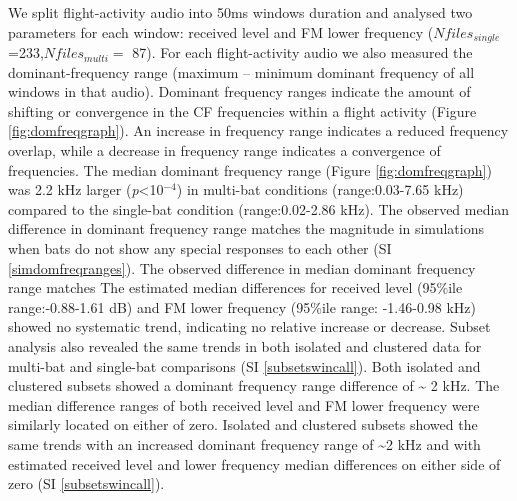 \documentclass[
]{book}
\begin{document}
We split flight-activity audio into 50ms windows duration and analysed two parameters for each window: received level and FM lower frequency (\(Nfiles_{single}\)=233,\(Nfiles_{multi}=\) 87). For each flight-activity audio we also measured the dominant-frequency range (maximum -- minimum dominant frequency of all windows in that audio). Dominant frequency ranges indicate the amount of shifting or convergence in the CF frequencies within a flight activity (Figure \ref{fig:domfreqgraph}). An increase in frequency range indicates a reduced frequency overlap, while a decrease in frequency range indicates a convergence of frequencies. The median dominant frequency range (Figure \ref{fig:domfreqgraph}) was 2.2 kHz larger (\emph{p}\textless10\(^{-4}\)) in multi-bat conditions (range:0.03-7.65 kHz) compared to the single-bat condition (range:0.02-2.86 kHz). The observed median difference in dominant frequency range matches the magnitude in simulations when bats do not show any special responses to each other (SI \ref{simdomfreqranges}). The observed difference in median dominant frequency range matches The estimated median differences for received level (95\(\%\)ile range:-0.88-1.61 dB) and FM lower frequency (95\(\%\)ile range: -1.46-0.98 kHz) showed no systematic trend, indicating no relative increase or decrease. Subset analysis also revealed the same trends in both isolated and clustered data for multi-bat and single-bat comparisons (SI \ref{subsetswincall}). Both isolated and clustered subsets showed a dominant frequency range difference of \textasciitilde{} 2 kHz. The median difference ranges of both received level and FM lower frequency were similarly located on either of zero. Isolated and clustered subsets showed the same trends with an increased dominant frequency range of \textasciitilde2 kHz and with estimated received level and lower frequency median differences on either side of zero (SI \ref{subsetswincall}).
\end{document}
